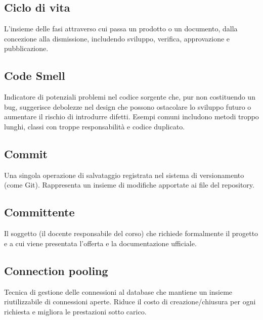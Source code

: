 \documentclass[a4paper, 11pt, oneside]{scrartcl} %
\begin{document}
\subsection*{Ciclo di vita}


L'insieme delle fasi attraverso cui passa un prodotto o un documento, dalla concezione alla dismissione, includendo sviluppo, verifica, approvazione e pubblicazione.

\vspace{0.5cm}

\subsection*{Code Smell}
Indicatore di potenziali problemi nel codice sorgente che, pur non costituendo un bug, suggerisce debolezze nel design che possono ostacolare lo sviluppo futuro o aumentare il rischio di introdurre difetti. Esempi comuni includono metodi troppo lunghi, classi con troppe responsabilità e codice duplicato.
\vspace{0.5cm}

\subsection*{Commit}


Una singola operazione di salvataggio registrata nel sistema di versionamento (come Git). Rappresenta un insieme di modifiche apportate ai file del repository.

\vspace{0.5cm}

\subsection*{Committente}


Il soggetto (il docente responsabile del corso) che richiede formalmente il progetto e a cui viene presentata l'offerta e la documentazione ufficiale.

\vspace{0.5cm}

\subsection*{Connection pooling}
Tecnica di gestione delle connessioni al database che mantiene un insieme riutilizzabile di connessioni aperte. Riduce il costo di creazione/chiusura per ogni richiesta e migliora le prestazioni sotto carico.
\vspace{0.5cm}
\end{document}
